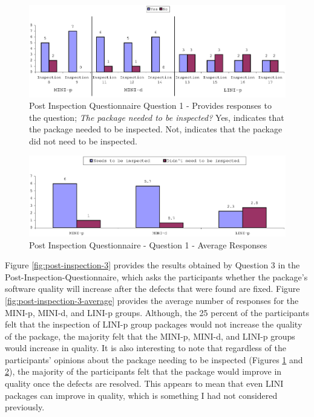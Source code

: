 \begin{figure}[!h]
  \centering
  \includegraphics[width=1.0\textwidth]{figs/Results/post-inspection-1.eps}
  \caption[Post Inspection Questionnaire - Question 1]{Post Inspection
    Questionnaire Question 1 - Provides responses to the question;
    \textit{The package needed to be inspected?} Yes, indicates that the
    package needed to be inspected. Not, indicates that the package did not
    need to be inspected.}
  \label{fig:post-inspection-1}
\end{figure}

\begin{figure}[!h]
  \centering
  \includegraphics[width=1.0\textwidth]{figs/Results/inspection-results-average-2.eps}
  \caption{Post Inspection Questionnaire - Question 1 - Average Responses}
  \label{fig:inspection-results-average-2}
\end{figure}

Figure \ref{fig:post-inspection-3} provides the results obtained by
Question 3 in the Post-Inspection-Questionnaire, which asks the
participants whether the package's software quality will increase after the
defects that were found are fixed. Figure
\ref{fig:post-inspection-3-average} provides the average number of
responses for the MINI-p, MINI-d, and LINI-p groups. Although, the 25
percent of the participants felt that the inspection of LINI-p group
packages would not increase the quality of the package, the majority felt
that the MINI-p, MINI-d, and LINI-p groups would increase in quality. It is
also interesting to note that regardless of the participants' opinions
about the package needing to be inspected (Figures
\ref{fig:post-inspection-1} and \ref{fig:inspection-results-average-2}),
the majority of the participants felt that the package would improve in
quality once the defects are resolved. This appears to mean that even LINI
packages can improve in quality, which is something I had not considered
previously.

